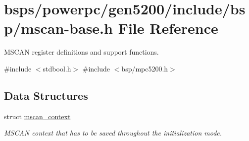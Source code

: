 \hypertarget{mscan-base_8h}{}\section{bsps/powerpc/gen5200/include/bsp/mscan-\/base.h File Reference}
\label{mscan-base_8h}


M\+S\+C\+AN register definitions and support functions.  


{\ttfamily \#include $<$stdbool.\+h$>$}\newline
{\ttfamily \#include $<$bsp/mpc5200.\+h$>$}\newline
\subsection*{Data Structures}
\begin{DoxyCompactItemize}
\item 
struct \mbox{\hyperlink{structmscan__context}{mscan\+\_\+context}}
\begin{DoxyCompactList}\small\item\em M\+S\+C\+AN context that has to be saved throughout the initialization mode. \end{DoxyCompactList}\end{DoxyCompactItemize}

